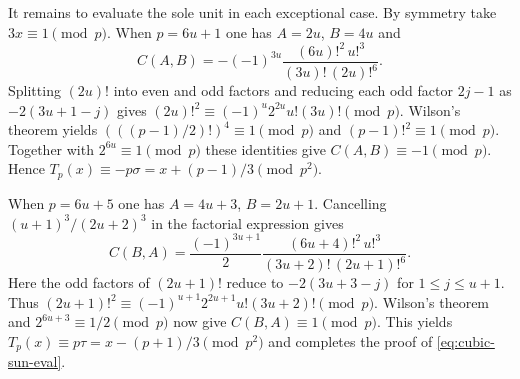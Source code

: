 \documentclass[11pt,a4paper]{article}
\theoremstyle{definition}\newtheorem{problem}[theorem]{Auxiliary problem}
\theoremstyle{remark}\newtheorem*{remark}{Remark}
\begin{document}
It remains to evaluate the sole unit in each exceptional case. By symmetry take $3x\equiv1\pmod p$.
When $p=6u+1$ one has $A=2u$, $B=4u$ and
\[
 C(A,B)=-(-1)^{3u}\frac{(6u)!^2\,u!^3}{(3u)!\,(2u)!^6}.
\]
Splitting $(2u)!$ into even and odd factors and reducing each odd factor $2j-1$ as $-2(3u+1-j)$ gives
$ (2u)!^2\equiv(-1)^u2^{2u}u!(3u)!\pmod p$.
Wilson's theorem yields $(((p-1)/2)!)^4\equiv1\pmod p$ and $(p-1)!^2\equiv1\pmod p$.
Together with $2^{6u}\equiv1\pmod p$ these identities give $C(A,B)\equiv-1\pmod p$.
Hence $T_p(x)\equiv-p\sigma=x+(p-1)/3\pmod{p^2}$.

When $p=6u+5$ one has $A=4u+3$, $B=2u+1$. Cancelling $(u+1)^3/(2u+2)^3$ in the factorial expression gives
\[
 C(B,A)=\frac{(-1)^{3u+1}}{2}
          \frac{(6u+4)!^2\,u!^3}{(3u+2)!\,(2u+1)!^6}.
\]
Here the odd factors of $(2u+1)!$ reduce to $-2(3u+3-j)$ for $1\leq j\leq u+1$.
Thus $(2u+1)!^2\equiv(-1)^{u+1}2^{2u+1}u!(3u+2)!\pmod p$.
Wilson's theorem and $2^{6u+3}\equiv1/2\pmod p$ now give $C(B,A)\equiv1\pmod p$.
This yields $T_p(x)\equiv p\tau=x-(p+1)/3\pmod{p^2}$ and completes the proof of \eqref{eq:cubic-sun-eval}.
\end{document}
